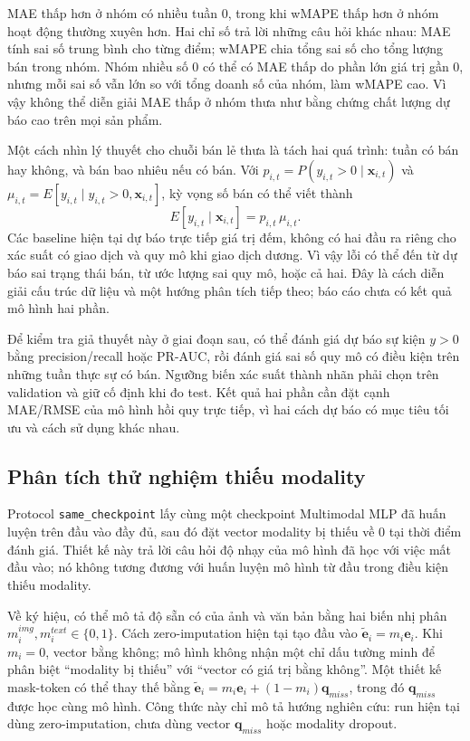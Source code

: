 \documentclass[12pt,a4paper,oneside]{article}
\begin{document}
MAE thấp hơn ở nhóm có nhiều tuần 0, trong khi wMAPE thấp hơn ở nhóm hoạt động thường xuyên hơn. Hai chỉ số trả lời những câu hỏi khác nhau: MAE tính sai số trung bình cho từng điểm; wMAPE chia tổng sai số cho tổng lượng bán trong nhóm. Nhóm nhiều số 0 có thể có MAE thấp do phần lớn giá trị gần 0, nhưng mỗi sai số vẫn lớn so với tổng doanh số của nhóm, làm wMAPE cao. Vì vậy không thể diễn giải MAE thấp ở nhóm thưa như bằng chứng chất lượng dự báo cao trên mọi sản phẩm.

Một cách nhìn lý thuyết cho chuỗi bán lẻ thưa là tách hai quá trình: tuần có bán hay không, và bán bao nhiêu nếu có bán. Với $p_{i,t}=P(y_{i,t}>0\mid\mathbf{x}_{i,t})$ và $\mu_{i,t}=E[y_{i,t}\mid y_{i,t}>0,\mathbf{x}_{i,t}]$, kỳ vọng số bán có thể viết thành
\begin{equation}
E[y_{i,t}\mid\mathbf{x}_{i,t}]=p_{i,t}\,\mu_{i,t}.
\end{equation}
Các baseline hiện tại dự báo trực tiếp giá trị đếm, không có hai đầu ra riêng cho xác suất có giao dịch và quy mô khi giao dịch dương. Vì vậy lỗi có thể đến từ dự báo sai trạng thái bán, từ ước lượng sai quy mô, hoặc cả hai. Đây là cách diễn giải cấu trúc dữ liệu và một hướng phân tích tiếp theo; báo cáo chưa có kết quả mô hình hai phần.

Để kiểm tra giả thuyết này ở giai đoạn sau, có thể đánh giá dự báo sự kiện $y>0$ bằng precision/recall hoặc PR-AUC, rồi đánh giá sai số quy mô có điều kiện trên những tuần thực sự có bán. Ngưỡng biến xác suất thành nhãn phải chọn trên validation và giữ cố định khi đo test. Kết quả hai phần cần đặt cạnh MAE/RMSE của mô hình hồi quy trực tiếp, vì hai cách dự báo có mục tiêu tối ưu và cách sử dụng khác nhau.

\subsection{Phân tích thử nghiệm thiếu modality}
Protocol \texttt{same\_checkpoint} lấy cùng một checkpoint Multimodal MLP đã huấn luyện trên đầu vào đầy đủ, sau đó đặt vector modality bị thiếu về 0 tại thời điểm đánh giá. Thiết kế này trả lời câu hỏi độ nhạy của mô hình đã học với việc mất đầu vào; nó không tương đương với huấn luyện mô hình từ đầu trong điều kiện thiếu modality.

Về ký hiệu, có thể mô tả độ sẵn có của ảnh và văn bản bằng hai biến nhị phân $m_i^{img},m_i^{text}\in\{0,1\}$. Cách zero-imputation hiện tại tạo đầu vào $\tilde{\mathbf e}_i=m_i\mathbf e_i$. Khi $m_i=0$, vector bằng không; mô hình không nhận một chỉ dấu tường minh để phân biệt ``modality bị thiếu'' với ``vector có giá trị bằng không''. Một thiết kế mask-token có thể thay thế bằng $\tilde{\mathbf e}_i=m_i\mathbf e_i+(1-m_i)\mathbf q_{miss}$, trong đó $\mathbf q_{miss}$ được học cùng mô hình. Công thức này chỉ mô tả hướng nghiên cứu: run hiện tại dùng zero-imputation, chưa dùng vector $\mathbf q_{miss}$ hoặc modality dropout.
\end{document}
